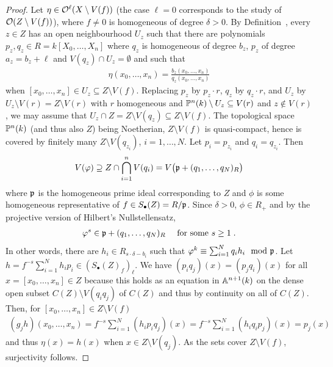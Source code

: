 \documentclass[a4paper,parskip=half,numbers=enddot, DIV=12]{scrreprt}
\begin{document}
\begin{proof}
    Let $\eta\in \mathcal{O}^\ell(X\setminus V(f))$ (the case $\ell=0$ corresponds to the study of $\mathcal{O}(Z\setminus V(f))$), where $f\neq 0$ is homogeneous of degree $\delta >0$. By Definition~, every $z\in Z$ has an open neighbourhood $U_z$ such that there are polynomials $p_z,q_z\in R=k[X_0,\ldots, X_n]$ where $q_z$ is homogeneous of degree $b_z$, $p_z$ of degree $a_z = b_z+\ell$ and $V(q_z)\cap U_z = \emptyset$ and such that 
    \begin{align*}
        \eta(x_0,\ldots, x_n) = \frac{b_z(x_0,\ldots, x_n)}{q_z(x_0,\ldots, x_n)}
    \end{align*}
    when $[x_0,\ldots, x_n]\in U_z\subseteq Z\setminus V(f)$. Replacing $p_z$ by $p_z\cdot r$, $q_z$ by $q_z\cdot r$, and $U_z$ by $U_z\setminus V(r) = Z\setminus V(r)$ with $r$ homogeneous and $\mathbb{P}^n(k)\setminus U_z \subseteq V(r)$ and $z\not \in V(r)$, we may assume that $U_z\cap Z = Z\setminus V(q_z)\subseteq Z\setminus V(f)$. The topological space $\mathbb{P}^n(k)$ (and thus also $Z$) being Noetherian, $Z\setminus V(f)$ is quasi-compact, hence is covered by finitely many $Z\setminus V(q_{z_i})$, $i=1,\ldots,N$. Let $p_i= p_{z_i}$ and $q_i = q_{z_i}$. Then 
    \begin{align*}
        V(\varphi) \supseteq Z\cap \bigcap_{i=1}^n V(q_i) = V\big(\mathfrak{p}+ (q_1,\ldots, q_N)_R\big)
    \end{align*}
    where $\mathfrak{p}$ is the homogeneous prime ideal corresponding to $Z$ and $\phi$ is some homogeneous representative of $f\in S_\bullet(Z) = R/\mathfrak{p}$. Since $\delta >0$, $\phi\in R_+$ and by the projective version of Hilbert's Nullstellensatz, 
    \begin{align*}
        \varphi^s \in  \mathfrak{p}+(q_1,\ldots,q_N)_R\quad\text{ for some }s\geq 1\;.
    \end{align*}
    In other words, there are $h_i\in R_{s\cdot \delta-b_i}$ such that $\varphi^k\equiv \sum_{i=1}^N q_ih_i \mod{\mathfrak{p}}$. Let $h= f^{-s}\sum_{i=1}^N h_ip_i\in (S_\bullet(Z)_f)_\ell$. We have $(p_i q_j)(x) = (p_jq_i)(x)$ for all $x=[x_0,\ldots,x_n]\in Z$ because this holds as an equation in $\mathbb{A}^{n+1}(k)$ on the dense open subset $C(Z)\setminus V(q_iq_j)$ of $C(Z)$ and thus by continuity on all of $C(Z)$. Then, for $[x_0,\ldots, x_n]\in Z\setminus V(f)$ 
    \begin{align*}
        (g_jh)(x_0,\ldots, x_n) = f^{-s}\sum_{i=1}^N (h_ip_iq_j)(x)= f^{-s}\sum_{i=1}^N (h_iq_ip_j)(x) = p_j(x)
    \end{align*}
    and thus $\eta(x) = h(x)$ when $x\in Z\setminus V(q_j)$. As the sets cover $Z\setminus V(f)$, surjectivity follows.
    

\end{proof}
\end{document}
